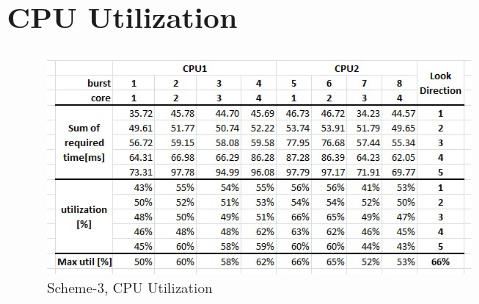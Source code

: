 \section{CPU Utilization}
\label{app:sch3:cpu_util}
\begin{figure}[h!]
	\centering
	\includegraphics[width=140mm]{figures/scheme4_util}
	\caption{Scheme-3, CPU Utilization}
	\label{fig:mm:scheme4_util}
\end{figure}